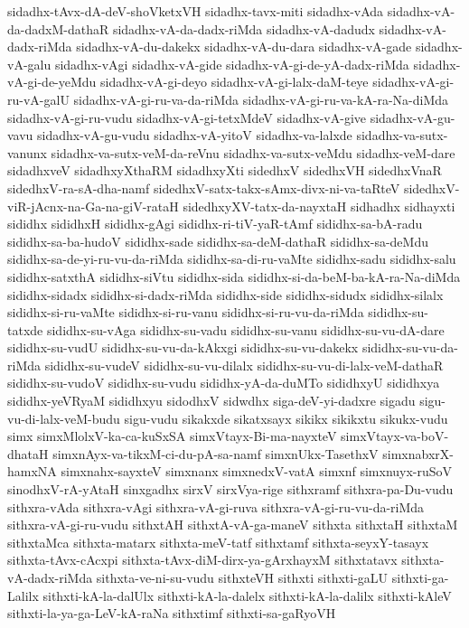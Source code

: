 {sidadhx-tAvx-dA-deV-shoVketxVH
sidadhx-tavx-miti
sidadhx-vAda
sidadhx-vA-da-dadxM-dathaR
sidadhx-vA-da-dadx-riMda
sidadhx-vA-dadudx
sidadhx-vA-dadx-riMda
sidadhx-vA-du-dakekx
sidadhx-vA-du-dara
sidadhx-vA-gade
sidadhx-vA-galu
sidadhx-vAgi
sidadhx-vA-gide
sidadhx-vA-gi-de-yA-dadx-riMda
sidadhx-vA-gi-de-yeMdu
sidadhx-vA-gi-deyo
sidadhx-vA-gi-lalx-daM-teye
sidadhx-vA-gi-ru-vA-galU
sidadhx-vA-gi-ru-va-da-riMda
sidadhx-vA-gi-ru-va-kA-ra-Na-diMda
sidadhx-vA-gi-ru-vudu
sidadhx-vA-gi-tetxMdeV
sidadhx-vA-give
sidadhx-vA-gu-vavu
sidadhx-vA-gu-vudu
sidadhx-vA-yitoV
sidadhx-va-lalxde
sidadhx-va-sutx-vanunx
sidadhx-va-sutx-veM-da-reVnu
sidadhx-va-sutx-veMdu
sidadhx-veM-dare
sidadhxveV
sidadhxyXthaRM
sidadhxyXti
sidedhxV
sidedhxVH
sidedhxVnaR
sidedhxV-ra-sA-dha-namf
sidedhxV-satx-takx-sAmx-divx-ni-va-taRteV
sidedhxV-viR-jAcnx-na-Ga-na-giV-rataH
sidedhxyXV-tatx-da-nayxtaH
sidhadhx
sidhayxti
sididhx
sididhxH
sididhx-gAgi
sididhx-ri-tiV-yaR-tAmf
sididhx-sa-bA-radu
sididhx-sa-ba-hudoV
sididhx-sade
sididhx-sa-deM-dathaR
sididhx-sa-deMdu
sididhx-sa-de-yi-ru-vu-da-riMda
sididhx-sa-di-ru-vaMte
sididhx-sadu
sididhx-salu
sididhx-satxthA
sididhx-siVtu
sididhx-sida
sididhx-si-da-beM-ba-kA-ra-Na-diMda
sididhx-sidadx
sididhx-si-dadx-riMda
sididhx-side
sididhx-sidudx
sididhx-silalx
sididhx-si-ru-vaMte
sididhx-si-ru-vanu
sididhx-si-ru-vu-da-riMda
sididhx-su-tatxde
sididhx-su-vAga
sididhx-su-vadu
sididhx-su-vanu
sididhx-su-vu-dA-dare
sididhx-su-vudU
sididhx-su-vu-da-kAkxgi
sididhx-su-vu-dakekx
sididhx-su-vu-da-riMda
sididhx-su-vudeV
sididhx-su-vu-dilalx
sididhx-su-vu-di-lalx-veM-dathaR
sididhx-su-vudoV
sididhx-su-vudu
sididhx-yA-da-duMTo
sididhxyU
sididhxya
sididhx-yeVRyaM
sididhxyu
sidodhxV
sidwdhx
siga-deV-yi-dadxre
sigadu
sigu-vu-di-lalx-veM-budu
sigu-vudu
sikakxde
sikatxsayx
sikikx
sikikxtu
sikukx-vudu
simx
simxMlolxV-ka-ca-kuSxSA
simxVtayx-Bi-ma-nayxteV
simxVtayx-va-boV-dhataH
simxnAyx-va-tikxM-ci-du-pA-sa-namf
simxnUkx-TasethxV
simxnabxrX-hamxNA
simxnahx-sayxteV
simxnanx
simxnedxV-vatA
simxnf
simxnuyx-ruSoV
sinodhxV-rA-yAtaH
sinxgadhx
sirxV
sirxVya-rige
sithxramf
sithxra-pa-Du-vudu
sithxra-vAda
sithxra-vAgi
sithxra-vA-gi-ruva
sithxra-vA-gi-ru-vu-da-riMda
sithxra-vA-gi-ru-vudu
sithxtAH
sithxtA-vA-ga-maneV
sithxta
sithxtaH
sithxtaM
sithxtaMca
sithxta-matarx
sithxta-meV-tatf
sithxtamf
sithxta-seyxY-tasayx
sithxta-tAvx-cAcxpi
sithxta-tAvx-diM-dirx-ya-gArxhayxM
sithxtatavx
sithxta-vA-dadx-riMda
sithxta-ve-ni-su-vudu
sithxteVH
sithxti
sithxti-gaLU
sithxti-ga-Lalilx
sithxti-kA-la-dalUlx
sithxti-kA-la-dalelx
sithxti-kA-la-dalilx
sithxti-kAleV
sithxti-la-ya-ga-LeV-kA-raNa
sithxtimf
sithxti-sa-gaRyoVH
}
